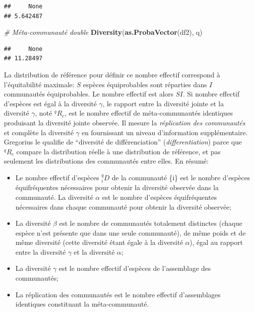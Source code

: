 \documentclass[
  11pt,
  french,
  a4paper,
  extrafontsizes,onecolumn,openright
  ]{memoir}
\newenvironment{Shaded}{\begin{snugshade}}{\end{snugshade}}
\newcommand{\CommentTok}[1]{\textcolor[rgb]{0.56,0.35,0.01}{\textit{#1}}}
\newcommand{\KeywordTok}[1]{\textcolor[rgb]{0.13,0.29,0.53}{\textbf{#1}}}
\newcommand{\NormalTok}[1]{#1}
\providecommand{\tightlist}{%
  \setlength{\itemsep}{0pt}\setlength{\parskip}{0pt}}
\begin{document}
\begin{verbatim}
##     None 
## 5.642487
\end{verbatim}

\begin{Shaded}
\begin{Highlighting}[]
\CommentTok{# Méta-communauté double}
\KeywordTok{Diversity}\NormalTok{(}\KeywordTok{as.ProbaVector}\NormalTok{(df2), q)}
\end{Highlighting}
\end{Shaded}

\begin{verbatim}
##     None 
## 11.28497
\end{verbatim}

\normalsize

La distribution de référence pour définir ce nombre effectif correspond à l'équitabilité maximale: \(S\) espèces équiprobables sont réparties dans \(I\) communautés équiprobables.
Le nombre effectif est alors \(SI\).
Si nombre effectif d'espèces est égal à la diversité \(\gamma\), le rapport entre la diversité jointe et la diversité \(\gamma\), noté \(^{q}\!R_{c}\), est le nombre effectif de méta-communautés identiques produisant la diversité jointe observée.
Il mesure la \emph{réplication des communautés} et complète la diversité \(\gamma\) en fournissant un niveau d'information supplémentaire.
Gregorius le qualifie de ``diversité de différenciation'' (\emph{differentiation}) parce que \(^{q}\!R_{c}\) compare la distribution réelle à une distribution de référence, et pas seulement les distributions des communautés entre elles.
En résumé:

\begin{itemize}
\tightlist
\item
  Le nombre effectif d'espèces \(^{q}_{i}\!D\) de la communauté \{i\} est le nombre d'espèces équifréquentes nécessaires pour obtenir la diversité observée dans la communauté.
  La diversité \(\alpha\) est le nombre d'espèces équifréquentes nécessaires dans chaque communauté pour obtenir la diversité observée;
\item
  La diversité \(\beta\) est le nombre de communautés totalement distinctes (chaque espèce n'est présente que dans une seule communauté), de même poids et de même diversité (cette diversité étant égale à la diversité \(\alpha\)), égal au rapport entre la diversité \(\gamma\) et la diversité \(\alpha\);
\item
  La diversité \(\gamma\) est le nombre effectif d'espèces de l'assemblage des communautés;
\item
  La réplication des communautés est le nombre effectif d'assemblages identiques constituant la méta-communauté.
\end{itemize}
\end{document}
